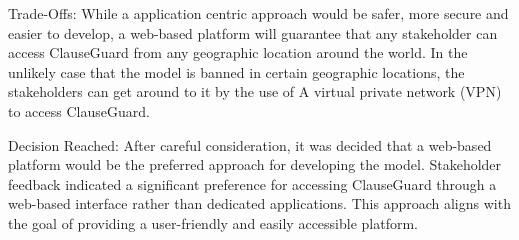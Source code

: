 \begin{itemize}
Trade-Offs: While a application centric approach would be safer, more secure and easier to develop, a web-based platform will guarantee that any stakeholder can access ClauseGuard from any geographic location around the world. In the unlikely case that the model is banned in certain geographic locations, the stakeholders can get around to it by the use of A virtual private network (VPN) to access ClauseGuard.

Decision Reached: After careful consideration, it was decided that a web-based platform would be the preferred approach for developing the model. Stakeholder feedback  indicated a significant preference for accessing ClauseGuard through a web-based interface rather than dedicated applications. This approach aligns with the goal of providing a user-friendly and easily accessible platform.














\end{itemize}



